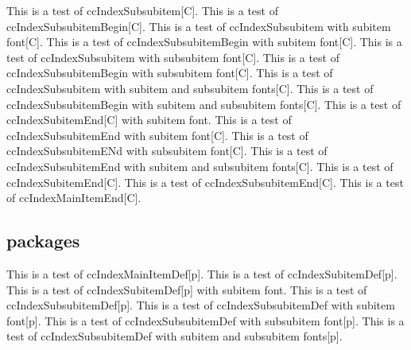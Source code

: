 \documentclass{article}
\begin{document}
{{{{This is a test of ccIndexSubsubitem[C].
This is a test of ccIndexSubsubitemBegin[C].
This is a test of ccIndexSubsubitem with subitem font[C].
This is a test of ccIndexSubsubitemBegin with subitem font[C].
This is a test of ccIndexSubsubitem with subsubitem font[C].
This is a test of ccIndexSubsubitemBegin with subsubitem font[C].
This is a test of ccIndexSubsubitem with subitem and subsubitem fonts[C].
This is a test of ccIndexSubsubitemBegin with subitem and subsubitem fonts[C].
\pagebreak
This is a test of ccIndexSubitemEnd[C] with subitem font.
This is a test of ccIndexSubsubitemEnd with subitem font[C].
This is a test of ccIndexSubsubitemENd with subsubitem font[C].
This is a test of ccIndexSubsubitemEnd with subitem and subsubitem fonts[C].
This is a test of ccIndexSubitemEnd[C].
This is a test of ccIndexSubsubitemEnd[C].
This is a test of ccIndexMainItemEnd[C].

\subsection{packages}
This is a test of ccIndexMainItemDef[p].
This is a test of ccIndexSubitemDef[p].
This is a test of ccIndexSubitemDef[p] with subitem font.
This is a test of ccIndexSubsubitemDef[p].
This is a test of ccIndexSubsubitemDef with subitem font[p].
This is a test of ccIndexSubsubitemDef with subsubitem font[p].
This is a test of ccIndexSubsubitemDef with subitem and subsubitem fonts[p].

}}}}
\end{document}
